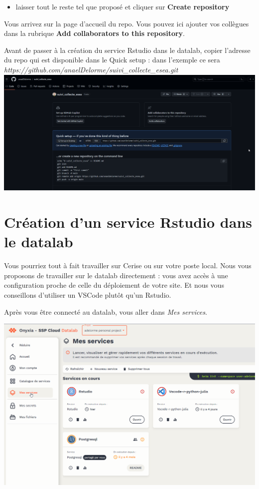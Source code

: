 \documentclass[
  letterpaper,
  DIV=11,
  numbers=noendperiod]{scrreprt}
\providecommand{\tightlist}{%
  \setlength{\itemsep}{0pt}\setlength{\parskip}{0pt}}\usepackage{longtable,booktabs,array}
\begin{document}
\begin{itemize}
\tightlist
\item
  laisser tout le reste tel que proposé et cliquer sur \textbf{Create
  repository}
\end{itemize}

Vous arrivez sur la page d'accueil du repo. Vous pouvez ici ajouter vos
collègues dans la rubrique \textbf{Add collaborators to this
repository}.

Avant de passer à la création du service Rstudio dans le datalab, copier
l'adresse du repo qui est disponible dans le Quick setup : dans
l'exemple ce sera
\emph{https://github.com/anaelDelorme/suivi\_collecte\_esea.git}
\includegraphics{./images/github_copy_link.png}

\hypertarget{cruxe9ation-dun-service-rstudio-dans-le-datalab}{%
\section{Création d'un service Rstudio dans le
datalab}\label{cruxe9ation-dun-service-rstudio-dans-le-datalab}}

Vous pourriez tout à fait travailler sur Cerise ou sur votre poste
local. Nous vous proposons de travailler sur le datalab directement :
vous avez accès à une configuration proche de celle du déploiement de
votre site. Et nous vous conseillons d'utiliser un VSCode plutôt qu'un
Rstudio.

Après vous être connecté au datalab, vous aller dans \emph{Mes
services}.

\includegraphics{./images/datalab_mes_services.png}
\end{document}
